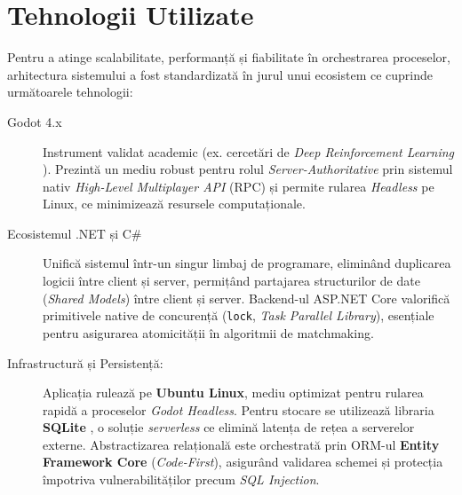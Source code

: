 \chapter{Tehnologii Utilizate}
\label{ch:tehnologii}

Pentru a atinge scalabilitate, performanță și fiabilitate în orchestrarea proceselor, arhitectura sistemului a fost standardizată în jurul unui ecosistem ce cuprinde următoarele tehnologii:

\begin{description}
    \item[Godot 4.x \cite{godot_docs}] Instrument validat academic (ex. cercetări de \textit{Deep Reinforcement Learning} \cite{godot_mdpi_paper}). Prezintă un mediu robust pentru rolul \textit{Server-Authoritative} prin sistemul nativ \textit{High-Level Multiplayer API} (RPC) și permite rularea \textit{Headless} pe Linux, ce minimizează resursele computaționale.

    \item[Ecosistemul .NET și C\# \cite{csharp_nutshell, aspnet_docs}] Unifică sistemul într-un singur limbaj de programare, eliminând duplicarea logicii între client și server, permițând partajarea structurilor de date (\textit{Shared Models}) între client și server. Backend-ul ASP.NET Core valorifică primitivele native de concurență (\texttt{lock}, \textit{Task Parallel Library}), esențiale pentru asigurarea atomicității în algoritmii de matchmaking.

    \item[Infrastructură și Persistență:] Aplicația rulează pe \textbf{Ubuntu Linux}, mediu optimizat pentru rularea rapidă a proceselor \textit{Godot Headless}. Pentru stocare se utilizează libraria \textbf{SQLite} \cite{sqlite_docs}, o soluție \textit{serverless} ce elimină latența de rețea a serverelor externe. Abstractizarea relațională este orchestrată prin ORM-ul \textbf{Entity Framework Core} \cite{ef_core_action} (\textit{Code-First}), asigurând validarea schemei și protecția împotriva vulnerabilităților precum \textit{SQL Injection}.
\end{description}